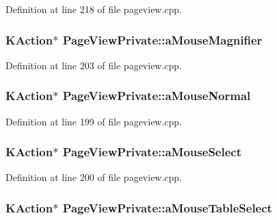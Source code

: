 Definition at line 218 of file pageview.\+cpp.

\hypertarget{classPageViewPrivate_a48a8cc9cf9c4aa483c79c8f81fc62ea7}{
\subsubsection[{a\+Mouse\+Magnifier}]{\setlength{\rightskip}{0pt plus 5cm}K\+Action$\ast$ Page\+View\+Private\+::a\+Mouse\+Magnifier}}\label{classPageViewPrivate_a48a8cc9cf9c4aa483c79c8f81fc62ea7}


Definition at line 203 of file pageview.\+cpp.

\hypertarget{classPageViewPrivate_aad98b5d46ed82c5423f13cd1a10d0253}{
\subsubsection[{a\+Mouse\+Normal}]{\setlength{\rightskip}{0pt plus 5cm}K\+Action$\ast$ Page\+View\+Private\+::a\+Mouse\+Normal}}\label{classPageViewPrivate_aad98b5d46ed82c5423f13cd1a10d0253}


Definition at line 199 of file pageview.\+cpp.

\hypertarget{classPageViewPrivate_a9e809032b95484f491dd439198b7bb8e}{
\subsubsection[{a\+Mouse\+Select}]{\setlength{\rightskip}{0pt plus 5cm}K\+Action$\ast$ Page\+View\+Private\+::a\+Mouse\+Select}}\label{classPageViewPrivate_a9e809032b95484f491dd439198b7bb8e}


Definition at line 200 of file pageview.\+cpp.

\hypertarget{classPageViewPrivate_a6b679535b8feee220664963bcb7b0b56}{
\subsubsection[{a\+Mouse\+Table\+Select}]{\setlength{\rightskip}{0pt plus 5cm}K\+Action$\ast$ Page\+View\+Private\+::a\+Mouse\+Table\+Select}}\label{classPageViewPrivate_a6b679535b8feee220664963bcb7b0b56}


